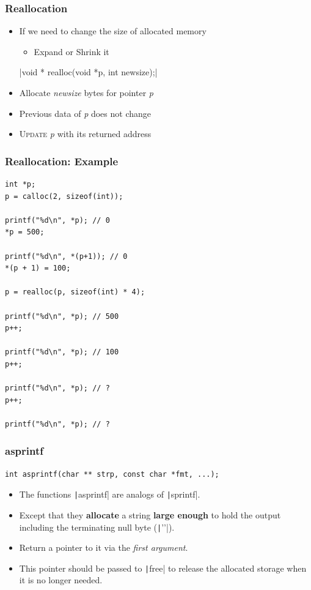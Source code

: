 \documentclass{../c-lecture}
\begin{document}
\begin{frame}
  \frametitle{Reallocation}
  \begin{itemize}
    \item If we need to change the size of allocated memory
    \begin{itemize}
      \item Expand or Shrink it
    \end{itemize}
    |void * realloc(void *p, int newsize);|
    \item
      Allocate \textit{\color{YellowOrange} newsize} bytes for pointer
      \textit{\color{LimeGreen} p}

    \item Previous data of \textit{\color{LimeGreen} p} does not change
    \item
      \textsc{\color{RubineRed} Update} \textit{\color{LimeGreen} p} with
      its returned address
  \end{itemize}
\end{frame}

\begin{frame}[fragile]
  \frametitle{Reallocation: Example}
  \scriptsize
  \begin{verbatim}
int *p;
p = calloc(2, sizeof(int));

printf("%d\n", *p); // 0
*p = 500;

printf("%d\n", *(p+1)); // 0
*(p + 1) = 100;

p = realloc(p, sizeof(int) * 4);

printf("%d\n", *p); // 500
p++;

printf("%d\n", *p); // 100
p++;

printf("%d\n", *p); // ?
p++;

printf("%d\n", *p); // ?
  \end{verbatim}
\end{frame}

\begin{frame}[fragile]
  \frametitle{asprintf}
  \begin{verbatim}
int asprintf(char ** strp, const char *fmt, ...);
  \end{verbatim}
  \begin{itemize}
    \item The functions \texttt|asprintf| are analogs of \texttt|sprintf|.
    \item Except that they \textbf{\color{YellowOrange} allocate} a string \textbf{\color{Yellow} large enough} to hold the output including the terminating null byte (\texttt|'\0'|).
    \item Return a pointer to it via the \textit{\color{LimeGreen} first argument}.
    \item This pointer should be passed to \texttt|free| to release the allocated storage when it is no longer needed.
  \end{itemize}
\end{frame}
\end{document}
